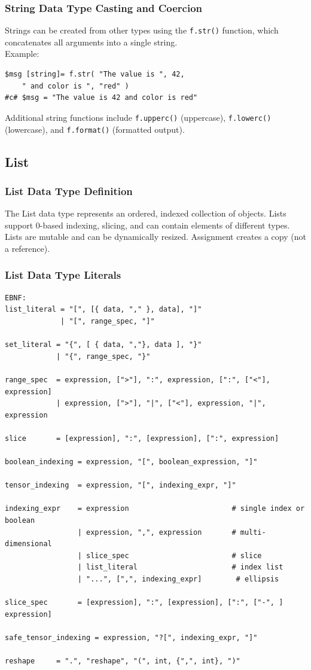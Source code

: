 \subsubsection{String Data Type Casting and Coercion}
Strings can be created from other types using the \texttt{f.str()} function, which concatenates all arguments into a single string.\\
Example:
\begin{verbatim}
$msg [string]= f.str( "The value is ", 42, 
    " and color is ", "red" )
#c# $msg = "The value is 42 and color is red"
\end{verbatim}
Additional string functions include \texttt{f.upperc()} (uppercase), \texttt{f.lowerc()} (lowercase), and \texttt{f.format()} (formatted output).
\subsection{List}
\subsubsection{List Data Type Definition}
The List data type represents an ordered, indexed collection of objects. Lists support 0-based indexing, slicing, and can contain elements of different types. Lists are mutable and can be dynamically resized. Assignment creates a copy (not a reference).
\subsubsection{List Data Type Literals}
\begin{verbatim}
EBNF:
list_literal = "[", [{ data, "," }, data], "]"
             | "[", range_spec, "]"

set_literal = "{", [ { data, ","}, data ], "}"
            | "{", range_spec, "}"

range_spec  = expression, [">"], ":", expression, [":", ["<"], expression]
            | expression, [">"], "|", ["<"], expression, "|", expression

slice       = [expression], ":", [expression], [":", expression]

boolean_indexing = expression, "[", boolean_expression, "]"

tensor_indexing  = expression, "[", indexing_expr, "]"

indexing_expr    = expression                        # single index or boolean
                 | expression, ",", expression       # multi-dimensional
                 | slice_spec                        # slice
                 | list_literal                      # index list
                 | "...", [",", indexing_expr]        # ellipsis

slice_spec       = [expression], ":", [expression], [":", ["-", ] expression]

safe_tensor_indexing = expression, "?[", indexing_expr, "]"

reshape     = ".", "reshape", "(", int, {",", int}, ")"
\end{verbatim}

